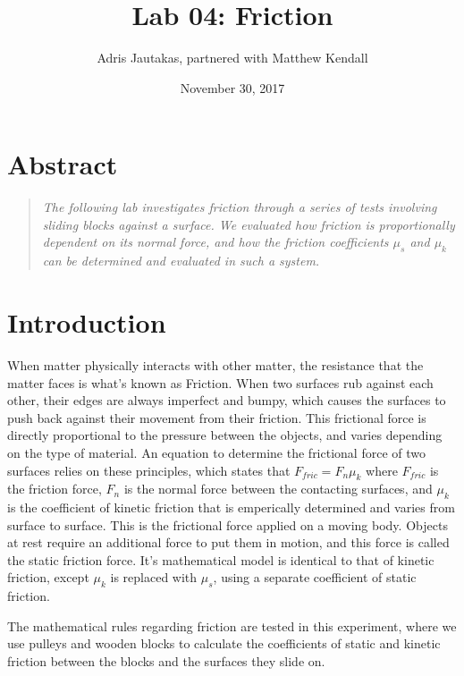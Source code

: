 \documentclass[12pt]{article}
\title{Lab 04: Friction}
\author{Adris Jautakas, partnered with Matthew Kendall}
\date{November 30, 2017}
\begin{document}
    \maketitle

    \pagebreak

    \section*{Abstract}
        \begin{quote}
        {\textit {\small 
            The following lab investigates friction through a series of tests 
            involving sliding blocks against a surface. We evaluated how 
            friction is proportionally dependent on its normal force, and how
            the friction coefficients $\mu_s$ and $\mu_k$ can be determined
            and evaluated in such a system.
        } }
        \end{quote}

    \section{Introduction}
        \par When matter physically interacts with other matter, the resistance
        that the matter faces is what's known as Friction. When two surfaces rub 
        against each other, their edges are always imperfect and bumpy, which 
        causes the surfaces to push back against their movement from their 
        friction. This frictional force is directly proportional to the pressure
        between the objects, and varies depending on the type of material. An
        equation to determine the frictional force of two surfaces relies on
        these principles, which states that $F_{fric} = F_n\mu_k$ where 
        $F_{fric}$ is the friction force, $F_n$ is the normal force between the
        contacting surfaces, and $\mu_k$ is the coefficient of kinetic friction
        that is emperically determined and varies from surface to surface. This
        is the frictional force applied on a moving body. Objects at rest require
        an additional force to put them in motion, and this force is called the
        static friction force. It's mathematical model is identical to that of
        kinetic friction, except $\mu_k$ is replaced with $\mu_s$, using a 
        separate coefficient of static friction.
        \par The mathematical rules regarding friction are tested in this
        experiment, where we use pulleys and wooden blocks to calculate the
        coefficients of static and kinetic friction between the blocks and the
        surfaces they slide on.
\end{document}

